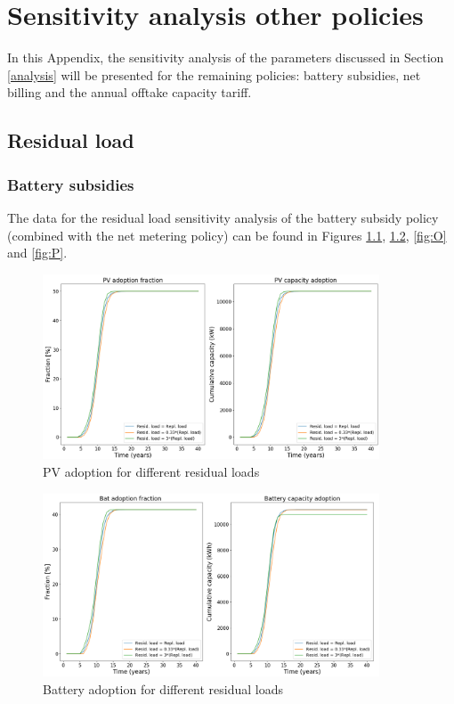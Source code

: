 \chapter{Sensitivity analysis other policies}
\label{app:2}
In this Appendix, the sensitivity analysis of the parameters discussed in Section \ref{analysis} will be presented for the remaining policies: battery subsidies, net billing and the annual offtake capacity tariff. 
\section{Residual load}
\subsection{Battery subsidies}
The data for the residual load sensitivity analysis of the battery subsidy policy (combined with the net metering policy) can be found in Figures \ref{fig:M}, \ref{fig:N}, \ref{fig:O} and \ref{fig:P}. 
\newline 
\begin{figure}[h!]
    \centering
    \includegraphics[width=10cm]{AppendixA/PVSubsresid.PNG}
    \caption{PV adoption for different residual loads}
    \label{fig:M}
\end{figure}
\noindent
\newline 
\begin{figure}[h!]
    \centering
    \includegraphics[width=10cm]{AppendixA/BatSubsresid.PNG}
    \caption{Battery adoption for different residual loads}
    \label{fig:N}
\end{figure}
